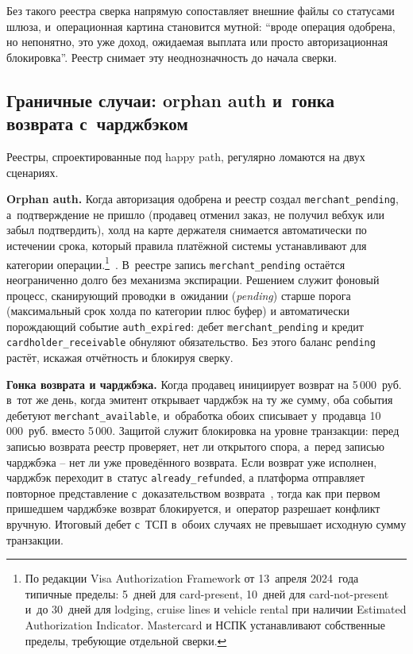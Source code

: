 Без такого реестра сверка напрямую сопоставляет внешние
файлы со статусами шлюза, и~операционная картина становится мутной:
\enquote{вроде операция одобрена, но непонятно, это уже доход,
ожидаемая выплата или просто авторизационная блокировка}. Реестр
снимает эту неоднозначность до начала сверки.

\subsection*{Граничные случаи: orphan auth и~гонка возврата с~чарджбэком}

Реестры, спроектированные под happy path, регулярно ломаются
на двух сценариях.

\textbf{Orphan auth.} Когда авторизация одобрена и реестр создал
\texttt{merchant\_pending}, а~подтверждение не пришло (продавец
отменил заказ, не получил вебхук или забыл подтвердить), холд
на карте держателя снимается автоматически по истечении срока,
который правила платёжной системы устанавливают для категории
операции.\footnote{По редакции Visa Authorization Framework
от 13~апреля 2024~года типичные пределы: 5~дней для card-present,
10~дней для card-not-present и~до 30~дней для lodging, cruise lines
и vehicle rental при наличии Estimated Authorization Indicator.
Mastercard и НСПК устанавливают собственные пределы, требующие
отдельной сверки.}~\cite{visa-core-rules,mc-rules,nspk-mir-rules}.
В~реестре запись \texttt{merchant\_pending} остаётся неограниченно долго
без механизма экспирации. Решением служит фоновый процесс,
сканирующий проводки в~ожидании (\textit{pending}) старше порога
(максимальный срок холда по категории плюс буфер) и автоматически
порождающий событие \texttt{auth\_expired}: дебет
\texttt{merchant\_pending} и кредит \texttt{cardholder\_receivable}
обнуляют обязательство. Без этого баланс \texttt{pending} растёт, искажая
отчётность и блокируя сверку.

\textbf{Гонка возврата и чарджбэка.} Когда продавец инициирует
возврат на 5\,000~руб. в~тот же день, когда эмитент открывает
чарджбэк на ту же сумму, оба события дебетуют
\texttt{merchant\_available}, и~обработка обоих списывает
у~продавца 10\,000~руб. вместо 5\,000. Защитой служит блокировка
на уровне транзакции: перед записью возврата реестр проверяет,
нет ли открытого спора, а~перед записью чарджбэка -- нет ли уже
проведённого возврата. Если возврат уже исполнен, чарджбэк
переходит в~статус \texttt{already\_refunded}, а платформа отправляет
повторное представление с~доказательством
возврата~\cite{mc-chargeback-guide}, тогда как при первом пришедшем
чарджбэке возврат блокируется, и~оператор разрешает конфликт вручную.
Итоговый дебет с~ТСП в~обоих случаях не превышает исходную сумму
транзакции.

